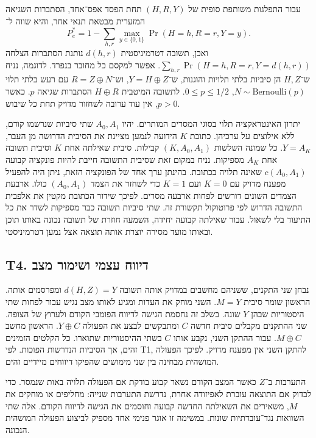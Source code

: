 \documentclass[11pt,a4paper]{article}
\DeclareRobustCommand{\textenglish}[1]{\foreignlanguage{english}{#1}}
\theoremstyle{definition}
\begin{document}
עבור התפלגות משותפת סופית של $(H,R,Y)$ תחת הפסד אפס־אחד, הסתברות השגיאה המזערית מבטאת תנאי אחר, והיא שווה ל־
\[
 P_e^*=1-\sum_{h,r}\max_{y\in\{0,1\}}\Pr(H=h,R=r,Y=y).
\]
ואכן, תשובה דטרמיניסטית $d(h,r)$ נותנת הסתברות הצלחה $\sum_{h,r}\Pr(H=h,R=r,Y=d(h,r))$. אפשר למקסם כל מחובר בנפרד. לדוגמה, נניח ש־$H,Z$ הן סיביות בלתי תלויות והוגנות, ש־$Y=H\oplus Z$, וש־$R=Z\oplus N$ עם רעש בלתי תלוי $N\sim\mathrm{Bernoulli}(p)$, $0\le p\le 1/2$. לתשובה המיטבית $H\oplus R$ הסתברות שגיאה $p$. כאשר $p>0$, אין עוד ערובה לשחזור מדויק תחת כל שיבוש.

יתרון האינטראקציה תלוי בסוגי המסרים המותרים. יהיו $A_0,A_1$ שתי סיביות שנרשמו קודם, ללא אילוצים על ערכיהן. כתובת $K$ הידועה לנמען מציינת את הסיבית הדרושה מן העבר, $Y=A_K$. כל שמונה השלשות $(K,A_0,A_1)$ קבילות. סיבית שאילתה אחת $K$ וסיבית תשובה אחת $A_K$ מספיקות. נניח במקום זאת שסיבית התשובה חייבת להיות פונקציה קבועה $c(A_0,A_1)$ שאינה תלויה בכתובת. בהינתן ערך אחד של הפונקציה הזאת, ניתן היה להפעיל מפענח מדויק עם $K=0$ ועם $K=1$ כדי לשחזר את הצמד $(A_0,A_1)$ כולו. ארבעת הצמדים השונים דורשים לפחות ארבעה מסרים. לפיכך שידור הכתובת מקטין את אלפבית התשובה הדרוש לפי פרוטוקול תקשורת זה. שתי סיביות תשובה כבר מספיקות לשדר את כל התיעוד בלי לשאול. עבור שאילתה קבועה יחידה, השמעה חוזרת של תשובה נכונה באותו תוכן ובאותו מועד מסירה יוצרת אותה תוצאה אצל נמען דטרמיניסטי.

\subsection{\textenglish{T4}. דיווח עצמי ושימור מצב}
\label{thm:observer-t4}

נבחן שני התקנים, ששניהם מחשבים במדויק אותה תשובה $d(H,Z)=Y$ ומפרסמים אותה. הראשון שומר סיבית $M=Y$. השני מוחק את העדות ומגיע לאותו מצב נגיש עבור לפחות שתי היסטוריות שבהן $Y$ שונה. בשלב זה נחסמת הגישה לדיווח הפומבי הקודם ולערוץ של הצופה. שני ההתקנים מקבלים סיבית חדשה $C$ ומתבקשים לבצע את הפעולה $Y\oplus C$. הראשון מחשב $M\oplus C$. עבור ההתקן השני, נקבע אותו $C$ בשתי ההיסטוריות שתוארו. כל הקלטים הזמינים זהים, אך הסיביות הנדרשות הפוכות. לפי \textenglish{T1}, להתקן השני אין מפענח מדויק. לפיכך הפעולה המושהית מבחינה בין שני מימושים שהפיקו דיווחים מיידיים זהים.

התערבות ב־$Z$ כאשר המצב הקודם נשאר קבוע בודקת אם הפעולה תלויה באות שנמסר. כדי לבדוק אם התוצאה עוברת לאפיזודה אחרת, נדרשת התערבות שנייה: מחליפים או מוחקים את $M$, משאירים את השאילתה החדשה קבועה וחוסמים את הגישה לדיווח הקודם. אלה שתי השוואות נגד־עובדתיות שונות. במשימה זו אוגר פנימי אחד מספיק לביצוע הפעולה המושהית הנכונה.
\end{document}
